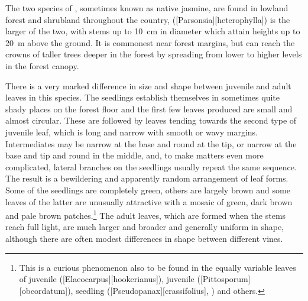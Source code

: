 The two species of , sometimes known as native jasmine, are found in lowland forest and shrubland throughout the country,  ([Parsonsia][heterophylla]) is the larger of the two, with stems up to \SI{10}{\centi\metre} in diameter which attain heights up to \SI{20}{\metre} above the ground.
It is commonest near forest margins, but can reach the crowns of taller trees deeper in the forest by spreading from lower to higher levels in the forest canopy.

There is a very marked difference in size and shape between juvenile and adult leaves in this species.
The seedlings establish themselves in sometimes quite shady places on the forest floor and the first few leaves produced are small and almost circular.
These are followed by leaves tending towards the second type of juvenile leaf, which is long and narrow with smooth or wavy margins.
Intermediates may be narrow at the base and round at the tip, or narrow at the base and tip and round in the middle, and, to make matters even more complicated, lateral branches on the seedlings usually repeat the same sequence.
The result is a bewildering and apparently random arrangement of leaf forms.
Some of the seedlings are completely green, others are largely brown and some leaves of the latter are unusually attractive with a mosaic of green, dark brown and pale brown patches.\footnote{This is a curious phenomenon also to be found in the equally variable leaves of juvenile  ([Elaeocarpus][hookerianus]), juvenile  ([Pittosporum][obcordatum]), seedling  ([Pseudopanax][crassifolius], ) and others.}
The adult leaves, which are formed when the stems reach full light, are much larger and broader and generally uniform in shape, although there are often modest differences in shape between different vines.

